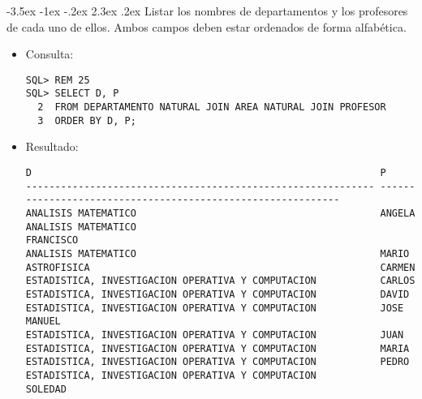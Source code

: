 \documentclass[11pt]{report}
\makeatletter
\renewcommand\chapter{\@startsection{chapter}{0}{\z@}%
    {-3.5ex \@plus -1ex \@minus -.2ex}%
    {2.3ex \@plus.2ex}%
    {\normalfont\Large\bfseries}}
\makeatother
\begin{document}
\chapter{Listar los nombres de departamentos y los profesores de cada uno de ellos. Ambos campos deben estar ordenados de forma alfabética.}
\begin{itemize}
  \item Consulta:
  \begin{verbatim}
SQL> REM 25
SQL> SELECT D, P
  2  FROM DEPARTAMENTO NATURAL JOIN AREA NATURAL JOIN PROFESOR
  3  ORDER BY D, P;
  \end{verbatim}
  \item{Resultado:}
  \begin{verbatim}
D                                                            P                                                                                                                      
------------------------------------------------------------ ------------------------------------------------------------                                                           
ANALISIS MATEMATICO                                          ANGELA                                                                                                                 
ANALISIS MATEMATICO                                          FRANCISCO                                                                                                              
ANALISIS MATEMATICO                                          MARIO                                                                                                                  
ASTROFISICA                                                  CARMEN                                                                                                                 
ESTADISTICA, INVESTIGACION OPERATIVA Y COMPUTACION           CARLOS                                                                                                                 
ESTADISTICA, INVESTIGACION OPERATIVA Y COMPUTACION           DAVID                                                                                                                  
ESTADISTICA, INVESTIGACION OPERATIVA Y COMPUTACION           JOSE MANUEL                                                                                                            
ESTADISTICA, INVESTIGACION OPERATIVA Y COMPUTACION           JUAN                                                                                                                   
ESTADISTICA, INVESTIGACION OPERATIVA Y COMPUTACION           MARIA                                                                                                                  
ESTADISTICA, INVESTIGACION OPERATIVA Y COMPUTACION           PEDRO                                                                                                                  
ESTADISTICA, INVESTIGACION OPERATIVA Y COMPUTACION           SOLEDAD                                                                                                                


\end{verbatim}
\end{itemize}
\end{document}
